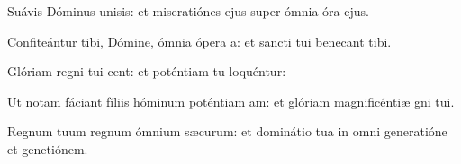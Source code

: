 \item {}

\item Suávis Dóminus unisis:\psstar{} et miseratiónes ejus super ómnia óra ejus.

\item Confiteántur tibi, Dómine, ómnia ópera a:\psstar{} et sancti tui benecant tibi.

\item Glóriam regni tui cent:\psstar{} et poténtiam tu loquéntur:

\item Ut notam fáciant fíliis hóminum poténtiam am:\psstar{} et glóriam magnificéntiæ gni tui.

\item Regnum tuum regnum ómnium sæcurum:\psstar{} et dominátio tua in omni generatióne et genetiónem.


